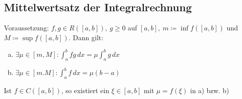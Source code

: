 \subsection{Mittelwertsatz der Integralrechnung}
Voraussetzung: $f,g \in R([a,b]),\ g \geq 0$ auf $[a,b],\ m \coloneqq \inf f([a,b])$ und $M \coloneqq \sup f([a,b])$. Dann gilt: \\
\begin{enumerate} [a)]
    \item $\exists \mu \in [m,M]: \int_a^b fg\,dx = \mu \int_a^b g\,dx$
    \item $\exists \mu \in [m.M]: \int_a^b f\,dx = \mu (b-a)$
\end{enumerate}
Ist $f \in C([a,b])$, so existiert ein $\xi \in [a,b]$ mit $\mu = f(\xi)$ in a) bzw. b)